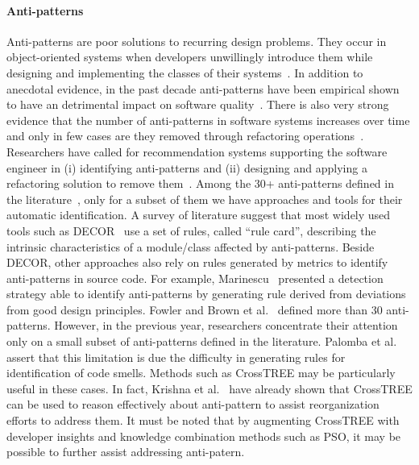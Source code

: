 \paragraph{Anti-patterns}

Anti-patterns are poor solutions to recurring design problems. They occur in object-oriented systems when developers unwillingly introduce them while designing and implementing the classes of their systems~\cite{fowler99}. In addition to anecdotal evidence, in the past decade anti-patterns have been empirical shown to have an detrimental impact on software quality~\cite{Ab11, Ar11, Ch10, Kh12, Li07}. There is also very strong evidence that the number of anti-patterns in software systems increases over time and only in few cases are they removed through refactoring operations~\cite{Ar11,Ch10}. Researchers have called for recommendation systems supporting the software engineer in (i) identifying anti-patterns and (ii) designing and applying a refactoring solution to remove them~\cite{Ba98}. Among the 30+ anti-patterns defined in the literature~\cite{fowler99,Ky05}, only for a subset of them we have
approaches and tools for their automatic identification. A survey of literature suggest that most widely used tools such as DECOR~\cite{decor} use a set of rules, called “rule card”, describing the intrinsic characteristics of a module/class affected by anti-patterns. Beside DECOR, other approaches also rely on rules generated by metrics to identify anti-patterns in source code. For example,
Marinescu~\cite{Ma04} presented a detection strategy able to identify anti-patterns by generating rule derived from deviations from good design principles. Fowler \cite{fowler99} and Brown
et al.~\cite{Br98} defined more than 30 anti-patterns. However, in the previous year, researchers concentrate their attention only on a small subset of anti-patterns defined in the literature. Palomba et al.~\cite{Pa15} assert that this limitation is due the difficulty in generating rules for identification of code smells. Methods such as CrossTREE may be particularly useful in these cases. In fact, Krishna et al.~\cite{krishna17a} have already shown that CrossTREE can be used to reason effectively about anti-pattern to assist reorganization efforts to address them. It must be noted that by augmenting CrossTREE with developer insights and knowledge combination methods such as PSO, it may be possible to further assist addressing anti-patern.